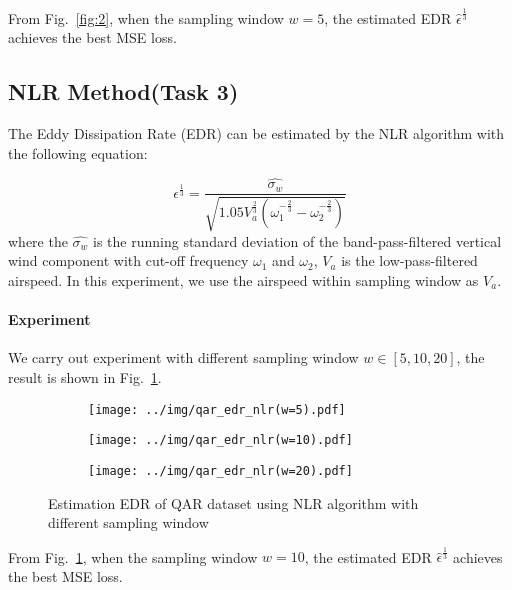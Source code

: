 \documentclass[runningheads]{llncs}
\begin{document}
From Fig.~\ref{fig:2}, when the sampling window $w=5$, the estimated EDR $\hat{\epsilon}^{\frac13}$ achieves the best MSE loss.

\subsection{NLR Method(Task 3)}

The Eddy Dissipation Rate (EDR) can be estimated by the NLR algorithm with the following equation:

\begin{equation}
    \epsilon^{\frac13}=\frac{\widehat{\sigma_w}}{\sqrt{1.05V_a^{\frac23}\left(\omega_1^{-\frac23}-\omega_2^{-\frac23}\right)}}
\end{equation}
where the $\widehat{\sigma_w}$ is the running standard deviation of the band-pass-filtered vertical wind component with cut-off frequency $\omega_1$ and $\omega_2$, 
$V_a$ is the low-pass-filtered airspeed. In this experiment, we use the airspeed within sampling window as $V_a$.

\paragraph{Experiment}

We carry out experiment with different sampling window $w \in [5,10,20]$, the result is shown in Fig.~\ref{fig:3}.

\begin{figure}[!htbp]
    \centering
    \begin{subfigure}{.4\textwidth}
        \centering
        \texttt{[image: ../img/qar\_edr\_nlr(w=5).pdf]}
    \end{subfigure}
    \begin{subfigure}{.4\textwidth}
        \centering
        \texttt{[image: ../img/qar\_edr\_nlr(w=10).pdf]}
    \end{subfigure}
    \begin{subfigure}{.4\textwidth}
        \centering
        \texttt{[image: ../img/qar\_edr\_nlr(w=20).pdf]}
    \end{subfigure}
    \caption{Estimation EDR of QAR dataset using NLR algorithm with different sampling window}
    \label{fig:3}
\end{figure}

From Fig.~\ref{fig:3}, when the sampling window $w=10$, the estimated EDR $\hat{\epsilon}^{\frac13}$ achieves the best MSE loss.
\end{document}
